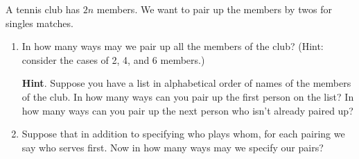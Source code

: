 \documentclass{book}
\begin{document}
\setcounter{cpjt}{86}
\addtocounter{cpjt}{-1}
\begin{activity}\label{tennispairings1}
\hypertarget{p-634}{}%
A tennis club has \(2n\) members. We want to pair up the members by twos for singles matches.%
\begin{enumerate}[font=\bfseries,label=(\alph*),ref=\alph*]
\item\label{task-131} \hypertarget{p-635}{}%
In how many ways may we pair up all the members of the club? (Hint: consider the cases of 2, 4, and 6 members.)%
\par\smallskip%
\noindent\textbf{Hint}.\hypertarget{hint-40}{}\quad%
\hypertarget{p-636}{}%
Suppose you have a list in alphabetical order of names of the members of the club. In how many ways can you pair up the first person on the list? In how many ways can you pair up the next person who isn't already paired up?%
\par\smallskip%
\noindent\item\label{task-132} \hypertarget{p-638}{}%
Suppose that in addition to specifying who plays whom, for each pairing we say who serves first.  Now in how many ways may we specify our pairs?%
\end{enumerate}
\end{activity}

\clearpage
\end{document}
